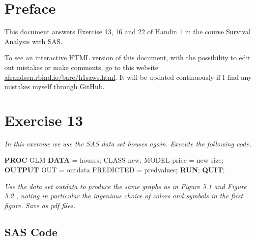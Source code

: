 \documentclass[a4paper,oneside]{memoir}
\newenvironment{Shaded}{\begin{snugshade}}{\end{snugshade}}
\newcommand{\KeywordTok}[1]{\textcolor[rgb]{0.13,0.29,0.53}{\textbf{#1}}}
\newcommand{\NormalTok}[1]{#1}
\begin{document}
\listoffigures

\newpage

\listoftables

\newpage

\hypertarget{preface}{%
\chapter*{Preface}\label{preface}}

This document answers Exercise 13, 16 and 22 of Handin 1 in the course Survival Analysis with SAS.

To see an interactive HTML version of this document, with the possibility to edit out mistakes or make comments, go to this website \href{https://afrandsen.rbind.io/bare/h1saws/index.html}{afrandsen.rbind.io/bare/h1saws.html}. It will be updated continuously if I find any mistakes myself through GitHub.

\newpage

\mainmatter


\pagestyle{mypagestyle}

\setcounter{secnumdepth}{3}

\hypertarget{exercise-13}{%
\chapter{Exercise 13}\label{exercise-13}}

\emph{In this exercise we use the SAS data set houses again. Execute the following code.}

\begin{Shaded}
\begin{Highlighting}[]
\KeywordTok{PROC}\NormalTok{ GLM}\KeywordTok{ DATA}\NormalTok{ = houses;}
\NormalTok{CLASS new;}
\NormalTok{MODEL price = new size;}
\KeywordTok{OUTPUT}\NormalTok{ OUT = outdata PREDICTED = predvalues;}
\KeywordTok{RUN}\NormalTok{;}
\KeywordTok{QUIT}\NormalTok{;}
\end{Highlighting}
\end{Shaded}

\emph{Use the data set outdata to produce the same graphs as in Figure 5.1 and Figure 5.2 \citep{Pedersen2019}, noting in particular the ingenious choice of colors and symbols in the first figure. Save as pdf files.}

\hypertarget{sas-code}{%
\section{SAS Code}\label{sas-code}}
\end{document}
